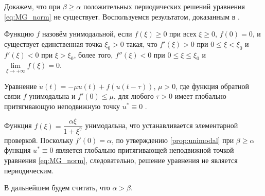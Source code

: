 Докажем, что при $\beta \geq \alpha$ положительных периодических решений уравнения \eqref{eq:MG_norm} не существует. Воспользуемся результатом, доказанным в \cite[Proposition 3.1]{Roest2007}.

\begin{definition}
Функцию $f$ назовём унимодальной, если $f(\xi) \geq 0$ при всех $\xi \geq 0$, $f(0) = 0$, и существует единственная точка $\xi_0 > 0$ такая, что $f'(\xi) > 0$ при $0 \leq \xi < \xi_0$ и $f'(\xi) < 0$ при $\xi > \xi_0$, более того, $f''(\xi) < 0$ при $0 \leq \xi \leq \xi_0$ и $\lim\limits_{\xi \to +\infty} f(\xi) = 0$.
\end{definition}

\begin{proposition}
\label{prop:unimodal}
Уравнение $\dot{u}(t) = -\mu u(t) + f(u(t - \tau))$, $\mu > 0$, где функция обратной связи $f$ унимодальна и $f'(0) \leq \mu$, для любого $\tau > 0$ имеет глобально притягивающую неподвижную точку $u^* \equiv 0$ \cite{Roest2007}.
\end{proposition}
% 
% 
% 

Функция $f(\xi) = \dfrac{\alpha \xi}{1 + \xi^{\gamma}}$ унимодальна, что устанавливается элементарной проверкой. Поскольку $f'(0) = \alpha$, по утверждению \eqref{prop:unimodal} при $\beta \geq \alpha$ функция $u^* \equiv 0$ является глобально притягивающей неподвижной точкой уравнения \eqref{eq:MG_norm}, следовательно, решение уравнения не является периодическим.

В дальнейшем будем считать, что $\alpha > \beta$.

